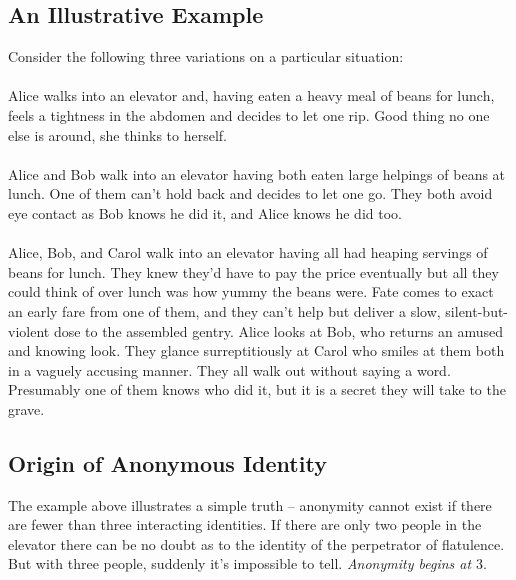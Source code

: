 \documentclass[pra,twocolumn,groupedaddress,10pt]{revtex4}
\theoremstyle{definition}
\begin{document}
\subsection{An Illustrative Example} \label{sec:illexa}

Consider the following three variations on a particular situation:

\paragraph{}

Alice walks into an elevator and, having eaten a heavy meal of beans for lunch, feels a tightness in the abdomen and decides to let one rip. Good thing no one else is around, she thinks to herself.

\paragraph{}

Alice and Bob walk into an elevator having both eaten large helpings of beans at lunch. One of them can't hold back and decides to let one go. They both avoid eye contact as Bob knows he did it, and Alice knows he did too.

\paragraph{}

Alice, Bob, and Carol walk into an elevator having all had heaping servings of beans for lunch. They knew they'd have to pay the price eventually but all they could think of over lunch was how yummy the beans were. Fate comes to exact an early fare from one of them, and they can't help but deliver a slow, silent-but-violent dose to the assembled gentry. Alice looks at Bob, who returns an amused and knowing look. They glance surreptitiously at Carol who smiles at them both in a vaguely accusing manner. They all walk out without saying a word. Presumably one of them knows who did it, but it is a secret they will take to the grave.

\subsection{Origin of Anonymous Identity} \label{sec:orianoide}

The example above illustrates a simple truth -- anonymity cannot exist if there are fewer than three interacting identities. If there are only two people in the elevator there can be no doubt as to the identity of the perpetrator of flatulence. But with three people, suddenly it's impossible to tell. \textit{Anonymity begins at $3$}. 
\end{document}
